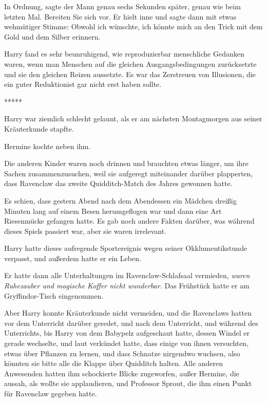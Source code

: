 \glqq{}In Ordnung\grqq{}, sagte der Mann genau sechs Sekunden später, genau wie
beim letzten Mal. \glqq{}Bereiten Sie sich vor.\grqq{} Er hielt inne und sagte
dann mit etwas wehmütiger Stimme: \glqq{}Obwohl ich wünschte, ich könnte mich an
den Trick mit dem Gold und dem Silber erinnern.\grqq{}

Harry fand es sehr beunruhigend, wie reproduzierbar menschliche Gedanken waren,
wenn man Menschen auf die gleichen Ausgangsbedingungen zurücksetzte und sie den
gleichen Reizen aussetzte. Es war das Zerstreuen von Illusionen, die ein guter
Reduktionist gar nicht erst haben sollte.

\begin{center}*****\end{center}

Harry war ziemlich schlecht gelaunt, als er am nächsten Montagmorgen aus seiner
Kräuterkunde stapfte.

Hermine kochte neben ihm.

Die anderen Kinder waren noch drinnen und brauchten etwas länger, um ihre Sachen
zusammenzusuchen, weil sie aufgeregt miteinander darüber plapperten, dass
Ravenclaw das zweite Quidditch-Match des Jahres gewonnen hatte.

Es schien, dass gestern Abend nach dem Abendessen ein Mädchen dreißig Minuten
lang auf einem Besen herumgeflogen war und dann eine Art Riesenmücke gefangen
hatte. Es gab noch andere Fakten darüber, was während dieses Spiels passiert
war, aber sie waren irrelevant.

Harry hatte dieses aufregende Sportereignis wegen seiner Okklumentikstunde
verpasst, und außerdem hatte er ein Leben.

Er hatte dann alle Unterhaltungen im Ravenclaw-Schlafsaal vermieden, \emph{waren
Ruhezauber und magische Koffer nicht wunderbar.} Das Frühstück hatte er am
Gryffindor-Tisch eingenommen.

Aber Harry konnte Kräuterkunde nicht vermeiden, und die Ravenclaws hatten vor
dem Unterricht darüber geredet, und nach dem Unterricht, und während des
Unterrichts, bis Harry von dem Babypelz aufgeschaut hatte, dessen Windel er
gerade wechselte, und laut verkündet hatte, dass einige von ihnen versuchten,
etwas über Pflanzen zu lernen, und dass Schnatze nirgendwo wuchsen, also könnten
sie bitte alle die Klappe über Quidditch halten. Alle anderen Anwesenden hatten
ihm schockierte Blicke zugeworfen, außer Hermine, die aussah, als wollte sie
applaudieren, und Professor Sprout, die ihm einen Punkt für Ravenclaw gegeben
hatte.

